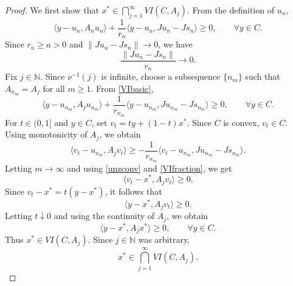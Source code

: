 \documentclass[10pt,a4paper]{amsart}
\begin{document}
\begin{proof}
We first show that $x^{*}\in \bigcap_{j=1}^{\infty}VI(C,A_j)$. From the definition of $u_n$,
\begin{equation}\label{VIbasic}
\langle y-u_n,A_nu_n\rangle+\frac{1}{r_n}\langle y-u_n,Ju_n-Js_n\rangle\geq 0,
\qquad \forall y\in C.
\end{equation}
Since $r_n\geq a>0$ and $\|Ju_n-Js_n\|\to 0$, we have
\begin{equation}\label{VIfraction}
\frac{\|Ju_n-Js_n\|}{r_n}\to 0.
\end{equation}
Fix $j\in\mathbb{N}$. Since $\nu^{-1}(j)$ is infinite, choose a subsequence $\{n_m\}$ such that $A_{n_m}=A_j$ for all $m\geq 1$. From \eqref{VIbasic},
\[
\langle y-u_{n_m},A_ju_{n_m}\rangle+\frac{1}{r_{n_m}}\langle y-u_{n_m},Ju_{n_m}-Js_{n_m}\rangle\geq 0,
\qquad \forall y\in C.
\]
For $t\in(0,1]$ and $y\in C$, set $v_t=ty+(1-t)x^{*}$. Since $C$ is convex, $v_t\in C$. Using monotonicity of $A_j$, we obtain
\[
\langle v_t-u_{n_m},A_jv_t\rangle\geq -\frac{1}{r_{n_m}}\langle v_t-u_{n_m},Ju_{n_m}-Js_{n_m}\rangle.
\]
Letting $m\to\infty$ and using \eqref{unzconv} and \eqref{VIfraction}, we get
\[
\langle v_t-x^{*},A_jv_t\rangle\geq 0.
\]
Since $v_t-x^{*}=t(y-x^{*})$, it follows that
\[
\langle y-x^{*},A_jv_t\rangle\geq 0.
\]
Letting $t\downarrow 0$ and using the continuity of $A_j$, we obtain
\[
\langle y-x^{*},A_jx^{*}\rangle\geq 0,
\qquad \forall y\in C.
\]
Thus $x^{*}\in VI(C,A_j)$. Since $j\in\mathbb{N}$ was arbitrary,
\begin{equation}\label{VIall}
x^{*}\in \bigcap_{j=1}^{\infty}VI(C,A_j).
\end{equation}


\end{proof}
\end{document}
